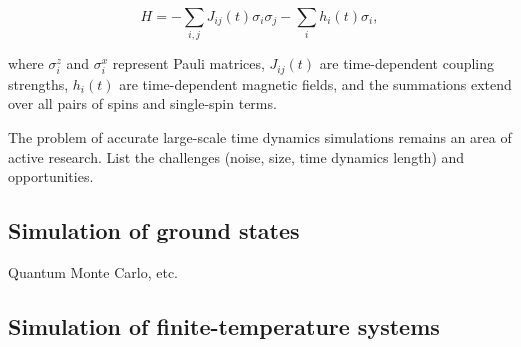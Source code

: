\begin{equation}
H = -\sum_{i, j} J_{ij}(t) \sigma_i \sigma_j - \sum_{i} h_i(t) \sigma_i,
\label{ising_hamiltonian}
\end{equation}

where $\sigma_i^z$ and $\sigma_i^x$ represent Pauli matrices, $J_{ij}(t)$ are time-dependent coupling strengths, $h_i(t)$ are time-dependent magnetic fields, and the summations extend over all pairs of spins and single-spin terms.

The problem of accurate large-scale time dynamics simulations remains an area of active research. List the challenges (noise, size, time dynamics length) and opportunities.


\subsection{Simulation of ground states}

Quantum Monte Carlo, etc. 

\subsection{Simulation of finite-temperature systems}

\fi







